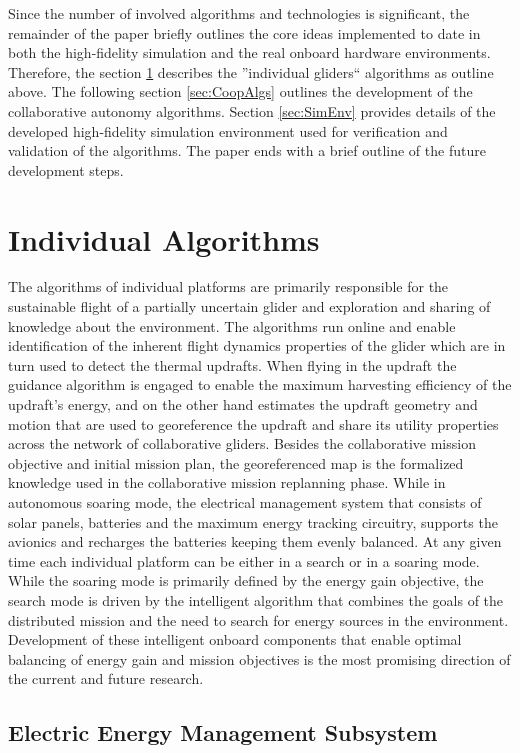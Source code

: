 \documentclass{ifacconf}
\begin{document}
Since the number of involved algorithms and technologies is significant, the remainder of the paper briefly outlines the core ideas implemented to date in both the high-fidelity simulation and the real onboard hardware environments. Therefore, the section \ref{sec:IndAlgs} describes the ''individual gliders`` algorithms as outline above. The following section \ref{sec:CoopAlgs}  outlines the development of the collaborative autonomy algorithms. Section \ref{sec:SimEnv} provides details of the developed high-fidelity simulation environment used for verification and validation of the algorithms. The paper ends with a brief outline of the future development steps.


\section{Individual Algorithms}
\label{sec:IndAlgs}

The algorithms of individual platforms are primarily responsible for the sustainable flight of a partially uncertain glider and exploration and sharing of knowledge about the environment. The algorithms run online and enable identification of the inherent flight dynamics properties of the glider which are in turn used to detect the thermal updrafts. When flying in the updraft the guidance algorithm is engaged to enable the maximum harvesting efficiency of the updraft's energy, and on the other hand estimates the updraft geometry and motion that are used to georeference the updraft and share its utility properties across the network of collaborative gliders. Besides the collaborative mission objective and initial mission plan, the georeferenced map is the formalized knowledge used in the collaborative mission replanning phase. While in autonomous soaring mode, the electrical management system that consists of solar panels, batteries and the maximum energy tracking circuitry, supports the avionics and recharges the batteries keeping them evenly balanced. At any given time each individual platform can be either in a search or in a soaring mode. While the soaring mode is primarily defined by the energy gain objective, the search mode is driven by the intelligent algorithm that combines the goals of the distributed mission and the need to search for energy sources in the environment. Development of these intelligent onboard components that enable optimal balancing of energy gain and mission objectives is the most promising direction of the current and future research.

\subsection{Electric Energy Management Subsystem}
\label{subsec:Electric}
\end{document}
